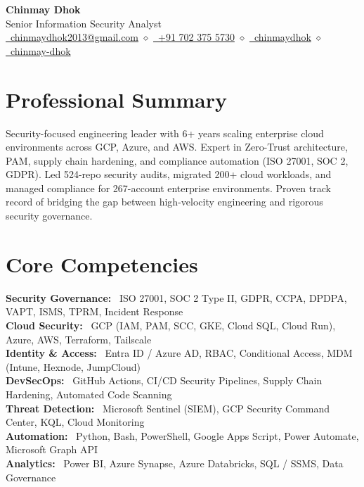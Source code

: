 \documentclass[11pt, letterpaper]{article}
\newcommand{\skilltag}[1]{%
  \small\textbf{\color{darktext}#1:}~%
}
\begin{document}
\begin{center}
    {\Huge\bfseries\color{darktext} Chinmay Dhok} \\[6pt]
    {\large\color{accent} Senior Information Security Analyst} \\[8pt]
    \small\color{graytext}
    \href{mailto:chinmaydhok2013@gmail.com}{\faEnvelope\ chinmaydhok2013@gmail.com}
    \quad$\diamond$\quad
    \href{tel:+917023755730}{\faPhone\ +91 702 375 5730}
    \quad$\diamond$\quad
    \href{https://linkedin.com/in/chinmaydhok}{\faLinkedin\ chinmaydhok}
    \quad$\diamond$\quad
    \href{https://github.com/chinmay-dhok}{\faGithub\ chinmay-dhok}
\end{center}

\vspace{-8pt}

\section{Professional Summary}
\small{\color{darktext}Security-focused engineering leader with 6+ years scaling enterprise cloud environments across GCP, Azure, and AWS. Expert in Zero-Trust architecture, PAM, supply chain hardening, and compliance automation (ISO 27001, SOC 2, GDPR). Led 524-repo security audits, migrated 200+ cloud workloads, and managed compliance for 267-account enterprise environments. Proven track record of bridging the gap between high-velocity engineering and rigorous security governance.}

\section{Core Competencies}
\begin{itemize}[leftmargin=0.15in, label={}]
    \small{\item{
     \skilltag{Security Governance} ISO 27001, SOC 2 Type II, GDPR, CCPA, DPDPA, VAPT, ISMS, TPRM, Incident Response \\[2pt]
     \skilltag{Cloud Security} GCP (IAM, PAM, SCC, GKE, Cloud SQL, Cloud Run), Azure, AWS, Terraform, Tailscale \\[2pt]
     \skilltag{Identity \& Access} Entra ID / Azure AD, RBAC, Conditional Access, MDM (Intune, Hexnode, JumpCloud) \\[2pt]
     \skilltag{DevSecOps} GitHub Actions, CI/CD Security Pipelines, Supply Chain Hardening, Automated Code Scanning \\[2pt]
     \skilltag{Threat Detection} Microsoft Sentinel (SIEM), GCP Security Command Center, KQL, Cloud Monitoring \\[2pt]
     \skilltag{Automation} Python, Bash, PowerShell, Google Apps Script, Power Automate, Microsoft Graph API \\[2pt]
     \skilltag{Analytics} Power BI, Azure Synapse, Azure Databricks, SQL / SSMS, Data Governance
    }}
\end{itemize}
\end{document}
